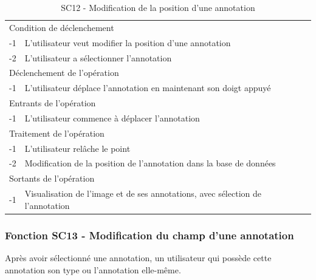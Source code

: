 \documentclass[a4paper]{article}
\begin{document}
\begin{table}[H]
  \centering
   \small
	\begin{tabular}{|c|p{12cm}|}
   		\hline
   			\rowcolor{lightgray}\multicolumn{2}{|c|}{\textbf{SC12 - Modification de la position d’une annotation}} \\
   		\hline
   			\multicolumn{2}{|l|}{Condition de d\'eclenchement} \\
   		\hline
   			-1 & L’utilisateur veut modifier la position d’une annotation\\
			-2 & L’utilisateur a sélectionner l’annotation\\
   		\hline
   			\multicolumn{2}{|l|}{D\'eclenchement de l'op\'eration} \\
   		\hline
   			-1 & L’utilisateur déplace l’annotation en maintenant son doigt appuyé\\
   		\hline
   			\multicolumn{2}{|l|}{Entrants de l'op\'eration} \\
   		\hline
   			-1 & L’utilisateur commence à déplacer l’annotation\\
   		\hline
   			\multicolumn{2}{|l|}{Traitement de l'op\'eration} \\
  		\hline
   			-1 & L’utilisateur relâche le point\\
			-2 & Modification de la position de l’annotation dans la base de données\\
   		\hline
   			\multicolumn{2}{|l|}{Sortants de l'op\'eration} \\
   		\hline
   			-1 & Visualisation de l’image et de ses annotations, avec sélection de l’annotation\\
   		\hline
	\end{tabular}
  \caption{SC12 - Modification de la position d’une annotation}
  \normalsize
  \label{tab:modification_position_annotation}
\end{table}

\subsubsection{Fonction SC13 - Modification du champ d’une annotation}
Après avoir sélectionné une annotation, un utilisateur qui possède cette annotation son type ou l’annotation elle-même.\\
\end{document}
